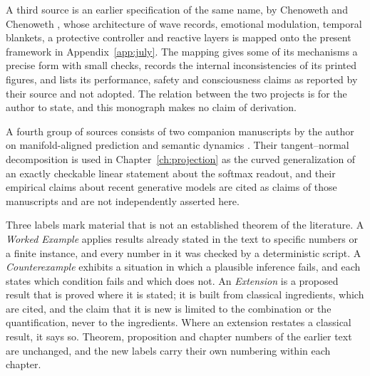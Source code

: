 \documentclass[11pt,twoside,openany]{book}
\theoremstyle{plain}
\theoremstyle{definition}
\theoremstyle{remark}
\theoremstyle{definition}
\begin{document}
A third source is an earlier specification of the same name, by Chenoweth and Chenoweth \cite{chenoweth2025}, whose architecture of wave records, emotional modulation, temporal blankets, a protective controller and reactive layers is mapped onto the present framework in Appendix~\ref{app:july}. The mapping gives some of its mechanisms a precise form with small checks, records the internal inconsistencies of its printed figures, and lists its performance, safety and consciousness claims as reported by their source and not adopted. The relation between the two projects is for the author to state, and this monograph makes no claim of derivation.

A fourth group of sources consists of two companion manuscripts by the author on manifold-aligned prediction and semantic dynamics \cite{flyxion2026npn,flyxion2026hall}. Their tangent--normal decomposition is used in Chapter~\ref{ch:projection} as the curved generalization of an exactly checkable linear statement about the softmax readout, and their empirical claims about recent generative models are cited as claims of those manuscripts and are not independently asserted here.

Three labels mark material that is not an established theorem of the literature. A \emph{Worked Example} applies results already stated in the text to specific numbers or a finite instance, and every number in it was checked by a deterministic script. A \emph{Counterexample} exhibits a situation in which a plausible inference fails, and each states which condition fails and which does not. An \emph{Extension} is a proposed result that is proved where it is stated; it is built from classical ingredients, which are cited, and the claim that it is new is limited to the combination or the quantification, never to the ingredients. Where an extension restates a classical result, it says so. Theorem, proposition and chapter numbers of the earlier text are unchanged, and the new labels carry their own numbering within each chapter.

\tableofcontents

\mainmatter











\appendix

\end{document}
